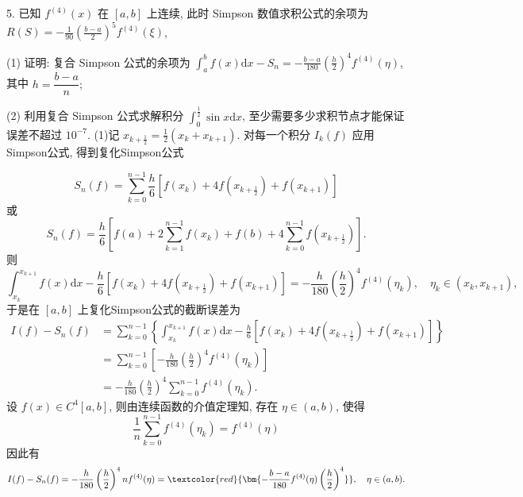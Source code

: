 \begin{tcolorbox}[breakable,enhanced,arc=0mm,outer arc=0mm,
		boxrule=0pt,toprule=1pt,leftrule=0pt,bottomrule=1pt, rightrule=0pt,left=0.2cm,right=0.2cm,
		titlerule=0.5em,toptitle=0.1cm,bottomtitle=-0.1cm,top=0.2cm,
		colframe=white!10!biru,colback=white!90!biru,coltitle=white,
            coltext=black,title =2024-05, title style={white!10!biru}, before skip=8pt, after skip=8pt,before upper=\hspace{2em},
		fonttitle=\bfseries,fontupper=\normalsize]

5. 已知 $ f^{(4)}(x) $ 在 $ [a, b] $ 上连续, 此时 Simpson 数值求积公式的余项为 $ \displaystyle R(S)=-\frac{1}{90}\left(\frac{b-a}{2}\right)^{5} f^{(4)}(\xi)$,

(1)  证明: 复合 Simpson 公式的余项为 $\displaystyle \int_{a}^{b} f(x) \mathrm{d} x-S_{n}=-\frac{b-a}{180}\left(\frac{h}{2}\right)^{4} f^{(4)}(\eta) $, 其中 $ h=\dfrac{b-a}{n} ; $

(2) 利用复合 Simpson 公式求解积分 $\displaystyle \int_{0}^{\frac{1}{2}} \sin x \mathrm{d} x $, 至少需要多少求积节点才能保证误差不超过 $ 10^{-7} $.
\tcblower
(1)记 $ x_{k+\frac{1}{2}}=\frac{1}{2}\left(x_{k}+x_{k+1}\right) $. 对每一个积分 $ I_{k}(f) $ 应用Simpson公式, 得到复化Simpson公式

$$
S_{n}(f)=\sum_{k=0}^{n-1} \frac{h}{6}\left[f\left(x_{k}\right)+4 f\left(x_{k+\frac{1}{2}}\right)+f\left(x_{k+1}\right)\right]
$$
或
$$
S_{n}(f)=\frac{h}{6}\left[f\left(a\right)+2 \sum_{k=1}^{n-1} f\left(x_{k}\right)+f\left(b\right)+4 \sum_{k=0}^{n-1} f\left(x_{k+\frac{1}{2}}\right)\right] .
$$
则
$$
 \int_{x_{k}}^{x_{k+1}} f(x) \mathrm{d} x-\frac{h}{6}\left[f\left(x_{k}\right)+4 f\left(x_{k+\frac{1}{2}}\right)+f\left(x_{k+1}\right)\right] =  -\frac{h}{180}\left(\frac{h}{2}\right)^{4} f^{(4)}\left(\eta_{k}\right), \quad \eta_{k} \in\left(x_{k}, x_{k+1}\right),
$$
于是在 $ [a, b] $ 上复化Simpson公式的截断误差为
$$
\begin{aligned}
I(f)-S_{n}(f) & =\sum_{k=0}^{n-1}\left\{\int_{x_{k}}^{x_{k+1}} f(x) \mathrm{d} x-\frac{h}{6}\left[f\left(x_{k}\right)+4 f\left(x_{k+\frac{1}{2}}\right)+f\left(x_{k+1}\right)\right]\right\} \\
& =\sum_{k=0}^{n-1}\left[-\frac{h}{180}\left(\frac{h}{2}\right)^{4} f^{(4)}\left(\eta_{k}\right)\right] \\
& =-\frac{h}{180}\left(\frac{h}{2}\right)^{4} \sum_{k=0}^{n-1} f^{(4)}\left(\eta_{k}\right) .
\end{aligned}
$$
设 $ f(x) \in C^{4}[a, b] $, 则由连续函数的介值定理知, 存在 $ \eta \in(a, b) $, 使得
$$
\frac{1}{n} \sum_{k=0}^{n-1} f^{(4)}\left(\eta_{k}\right)=f^{(4)}(\eta)
$$
因此有
$$
I(f)-S_{n}(f)  =-\frac{h}{180}\left(\frac{h}{2}\right)^{4} n f^{(4)}(\eta)  =\textcolor{red}{\bm{-\frac{b-a}{180} f^{(4)}(\eta)\left(\frac{h}{2}\right)^{4}}}, \quad \eta \in(a, b) .
$$


\end{tcolorbox}
